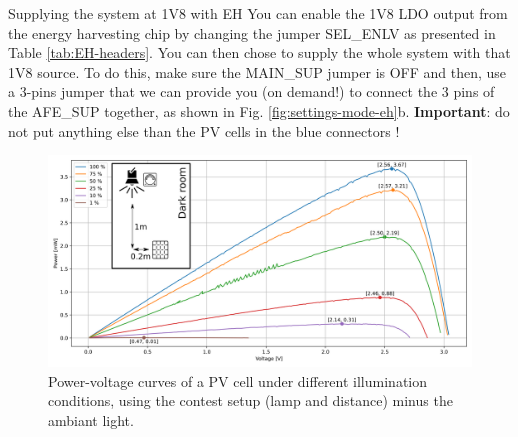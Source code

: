 \begin{bclogo}[couleur = gray!20, arrondi = 0.2, logo=\bcinfo]{Supplying the system at 1V8 with EH}
You can enable the 1V8 LDO output from the energy harvesting chip by changing the jumper SEL\_ENLV as presented in Table \ref{tab:EH-headers}. You can then chose to supply the whole system with that 1V8 source. To do this, make sure the MAIN\_SUP jumper is OFF and then, use a 3-pins jumper that we can provide you (on demand!) to connect the 3 pins of the AFE\_SUP together, as shown in Fig. \ref{fig:settings-mode-eh}b. \textbf{Important}: do not put anything else than the PV cells in the blue connectors !
\end{bclogo}

\begin{figure}[h!]
    \centering
    \includegraphics[width=0.9\textheight, angle=90]{figs/pvcell-carac.png}
    \caption{Power-voltage curves of a PV cell under different illumination conditions, using the contest setup (lamp and distance) minus the ambiant light.}
    \label{fig:pvcell-carac}
\end{figure}
